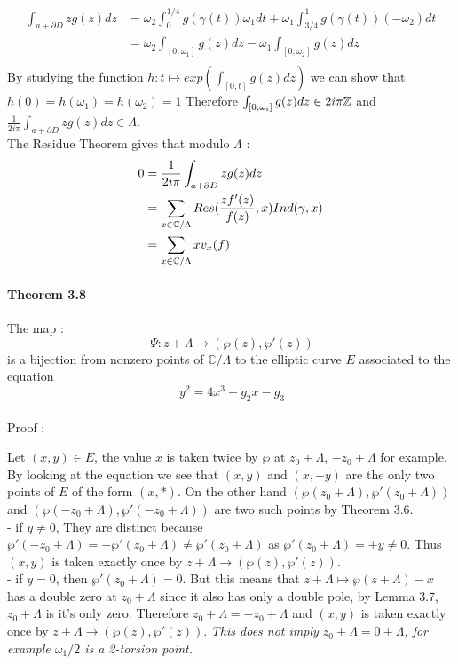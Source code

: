\documentclass[letterpaper,10pt]{article}
\begin{document}
\begin{align*} \int_{a + \partial D} zg(z)dz &= \omega_2\int_{0}^{1/4} g(\gamma(t)) \omega_1 dt + \omega_1\int_{3/4}^{1} g(\gamma(t)) (-\omega_2) dt \\
    &= \omega_2\int_{[0,\omega_1]} g(z) dz - \omega_1\int_{[0,\omega_2]} g(z)  dz\\
\end{align*}
By studying the function $h : t \mapsto exp(\int_{[0,t]}g(z)dz)$ we can show that   $h(0) = h(\omega_1) = h(\omega_2)= 1$
Therefore $\int_{[0,\omega_i]} g(z) dz \in 2i\pi\mathbb{Z}$ and $\frac{1}{2i\pi}\int_{a + \partial D} z g(z)dz \in \Lambda$.\\
The Residue Theorem gives that modulo $\Lambda$ : \begin{align*}0 &= \frac{1}{2i\pi}\int_{a + \partial D} z g(z)dz\\
  &= \sum_{x\in \mathbb{C}/\Lambda} Res(\frac{zf'(z)}{f(z)},x) Ind(\gamma,x)\\
  &= \sum_{x\in \mathbb{C}/\Lambda}x v_x(f) \\
\end{align*}


\paragraph{Theorem 3.8} The map : \[\ \Psi : z + \Lambda \to (\wp(z),\wp'(z)) \]
is a bijection from nonzero points of $\mathbb{C} / \Lambda$ to the elliptic curve $E$ associated to the equation \[\ y^2 = 4x^3 - g_2x - g_3 \]
{\itshape \paragraph{} Proof :} Let $(x,y) \in E$, the value $x$ is taken twice by $\wp$ at $z_0 + \Lambda$, $-z_0 + \Lambda$ for example.
By looking at the equation we see that $(x,y)$ and $(x,-y)$ are the only two points of $E$ of the form $(x,*)$. On the other hand $(\wp(z_0+ \Lambda),\wp'(z_0+ \Lambda))$
 and $(\wp(-z_0+ \Lambda),\wp'(-z_0+ \Lambda))$ are two such points by Theorem 3.6. \\ 
 - if $ y \neq 0$, They are distinct because $\wp'(-z_0+ \Lambda) = -\wp'(z_0+ \Lambda) \neq \wp'(z_0+ \Lambda)$ 
 as $\wp'(z_0+ \Lambda) = \pm y \neq 0.$ Thus $(x,y)$ is taken exactly once by $z + \Lambda \to (\wp(z),\wp'(z))$.\\ 
 - if $y = 0$, then $\wp'(z_0 + \Lambda) = 0$. But this means that $z+ \Lambda \mapsto \wp(z+ \Lambda) - x$ 
has a double zero at $z_0+ \Lambda$ since it also has only a double pole, by Lemma 3.7, $z_0 + \Lambda$ is it's only zero. Therefore $z_0 + \Lambda = -z_0 + \Lambda$ 
and $(x,y)$ is taken exactly once by $z + \Lambda \to (\wp(z),\wp'(z))$. {\itshape This does not imply $z_0 + \Lambda = 0 + \Lambda$, for example $\omega_1/2$ is
a 2-torsion point.}
\end{document}
